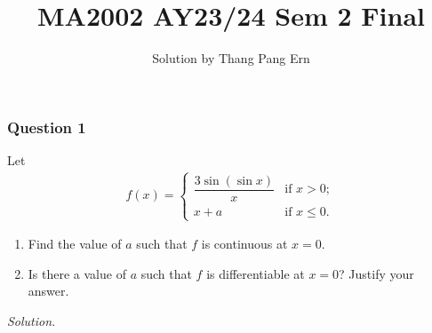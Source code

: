 \documentclass[12pt]{article}
\title{MA2002 AY23/24 Sem 2 Final}
\author{Solution by Thang Pang Ern}
\begin{document}
\maketitle
\subsubsection*{Question 1}
Let \begin{align*}
    f(x)=\begin{cases}
        \dfrac{3\operatorname{sin}\left(\operatorname{sin}x\right)}{x} & \text{if }x>0;\\
        x+a & \text{if }x\le 0.
    \end{cases}
\end{align*}
\begin{enumerate}[label=\textbf{(\roman*)}]
    \itemsep 0em
    \item Find the value of $a$ such that $f$ is continuous at $x=0$.
    \item Is there a value of $a$ such that $f$ is differentiable at $x=0$? Justify your answer.
\end{enumerate}
\textit{Solution.}
\end{document}
